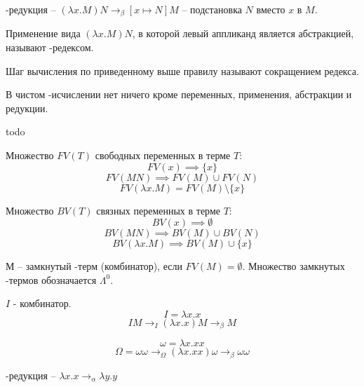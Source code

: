 \begin{definition}
    \beta-редукция -- $(\lambda x. M) N \rightarrow_{\beta} [x \mapsto N] M$ -- подстановка $N$ вместо $x$ в $M$.
\end{definition}
\begin{definition}
    Применение вида $(\lambda x. M) N$, в которой левый аппликанд является абстракцией, называют \beta-редексом.
\end{definition}
\begin{definition}
    Шаг вычисления по приведенному выше правилу называют сокращением редекса.
\end{definition}
\begin{definition}
    В чистом \lambda-исчислении нет ничего кроме переменных, применения, абстракции и редукции.
\end{definition} 

todo
\begin{definition}
    Множество $FV(T)$ свободных переменных в терме $T$:
    $$FV(x) \implies \{x\}$$
    $$FV(M N) \implies FV(M) \cup FV(N)$$
    $$FV(\lambda x. M) = FV(M) \setminus \{x\}$$
\end{definition}

\begin{definition}
    Множество $BV(T)$ связных переменных в терме $T$:
    $$BV(x) \implies \emptyset$$
    $$BV(M N) \implies BV(M) \cup BV(N)$$
    $$BV(\lambda x. M) \implies BV(M) \cup \{x\}$$
\end{definition}


\begin{definition}
    М -- замкнутый \lambda-терм (комбинатор), если $FV(M) = \emptyset$. Множество замкнутых \lambda-термов обозначается $\Lambda^{0}$.
\end{definition} 
\begin{example}

    $I$ - комбинатор.
    $$I = \lambda x. x$$
    $$IM \rightarrow_{I} (\lambda x. x) M \rightarrow_{\beta} M$$
\end{example}
\begin{example}
    $$\omega = \lambda x. x x$$
    $$\Omega = \omega \omega \rightarrow_{\Omega} (\lambda x. x x) \omega \rightarrow_{\beta} \omega \omega$$
\end{example}

\begin{definition}
    \alpha-редукция -- $\lambda x. x \rightarrow_{\alpha} \lambda y. y$
\end{definition} 